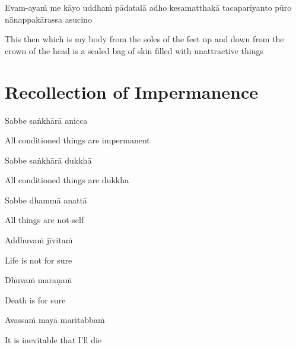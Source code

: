 Evam-ayaṁ me kāyo uddhaṁ pādatalā adho kesamatthakā tacapariyanto pūro nānappakārassa asucino

\begin{english}
  This then which is my body from the soles of the feet up and down from the crown of the head is a sealed bag of skin filled with unattractive things
\end{english}

\suttaRef{[DN 22]}


\section{Recollection of Impermanence}
\label{recollection-impermanence}

\begin{leader}
\end{leader}

Sabbe saṅkhārā anicca

\begin{english}
  All conditioned things are impermanent
\end{english}

Sabbe saṅkhārā dukkhā

\begin{english}
  All conditioned things are dukkha
\end{english}

Sabbe dhammā anattā

\begin{english}
  All things are not-self
\end{english}

\suttaRef{[Dhp 277-279]}

Addhuvaṁ jīvitaṁ

\begin{english}
  Life is not for sure
\end{english}

Dhuvaṁ maraṇaṁ

\begin{english}
  Death is for sure
\end{english}

Avassaṁ mayā maritabbaṁ

\begin{english}
  It is inevitable that I’ll die
\end{english}

